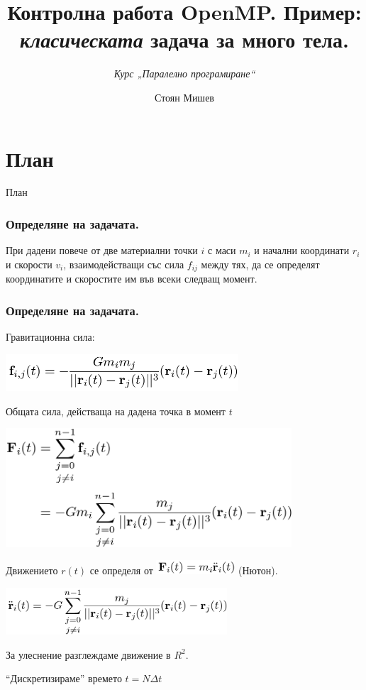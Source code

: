 \documentclass{beamer}
\title{Контролна работа OpenMP. Пример: \textit{класическата} задача за много тела.}
\subtitle{\textit{Курс „Паралелно програмиране“}}
\author{\newline \newline Стоян Мишев}
\date{} %
\begin{document}
\lstset{language=Python}
{ 
\frame{\titlepage}}


\section*{План}\begin{frame}{План}\tableofcontents\end{frame}

\begin{frame}
  \frametitle{Определяне на задачата.}
  При дадени повече от две материални точки $i$ с маси $m_i$ и начални
  координати $r_i$ и скорости $v_i$, взаимодействащи със сила $f_{ij}$
  между тях, да се определят координатите и скоростите им във всеки
  следващ момент.
\end{frame}

\begin{frame}
  \frametitle{Определяне на задачата.}
  Гравитационна сила:


  \includegraphics[width=0.65\textwidth]{force1} \pause

  Общата сила, действаща на дадена точка в момент $t$ 

  \includegraphics[width=0.8\textwidth]{force2}
\end{frame}

\begin{frame}
  Движението $r(t)$ се определя от 
  \includegraphics[width=0.22\textwidth]{force3} (Нютон). \pause

  \includegraphics[width=0.62\textwidth]{accel}

  За улеснение разглеждаме движение в $R^2$.

  ``Дискретизираме'' времето $t=N\Delta t$
\end{frame}
\end{document}
